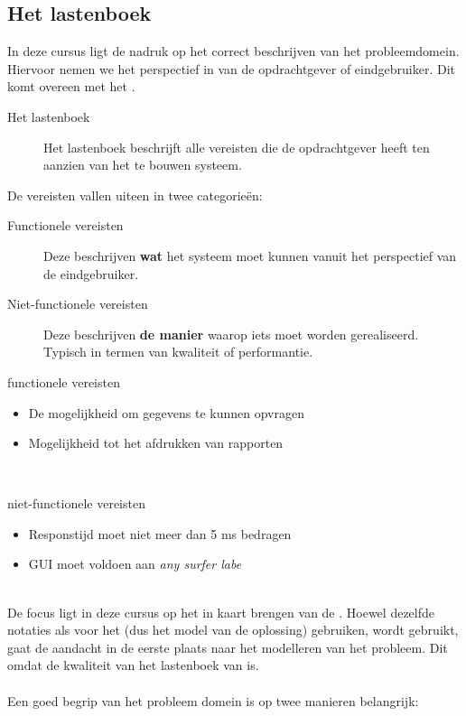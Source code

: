 \documentclass[../main.tex]{subfiles}
\begin{document}
\subsection{Het lastenboek}
In deze cursus ligt de nadruk op het correct beschrijven van het probleemdomein. Hiervoor nemen we het perspectief in van de opdrachtgever of eindgebruiker. Dit komt overeen met het .

\begin{description}
	\item[Het lastenboek] Het lastenboek beschrijft alle vereisten die de opdrachtgever heeft ten aanzien van het te bouwen systeem.
\end{description}
De vereisten vallen uiteen in twee categorie\"en:
\begin{description}
	\item[Functionele vereisten] Deze beschrijven \textbf{wat} het systeem moet kunnen vanuit het perspectief van de eindgebruiker.
	\item[Niet-functionele vereisten] Deze beschrijven \textbf{de manier} waarop iets moet worden gerealiseerd. Typisch in termen van kwaliteit of performantie.
\end{description}
\begin{ex}{functionele vereisten}
\begin{itemize}
	\item De mogelijkheid om gegevens te kunnen opvragen
	\item Mogelijkheid tot het afdrukken van rapporten
\end{itemize}
\end{ex}
\\
\begin{ex}{niet-functionele vereisten}
\begin{itemize}
	\item Responstijd moet niet meer dan 5 ms bedragen
	\item GUI moet voldoen aan \textit{any surfer labe}
\end{itemize}
\end{ex}
\\
De focus ligt in deze cursus op het in kaart brengen van de . Hoewel dezelfde notaties als voor het  (dus het model van de oplossing) gebruiken, wordt gebruikt, gaat de aandacht in de eerste plaats naar het modelleren van het probleem. Dit omdat de kwaliteit van het lastenboek van  is.\\
\\
Een goed begrip van het probleem domein is op twee manieren belangrijk:
\end{document}
